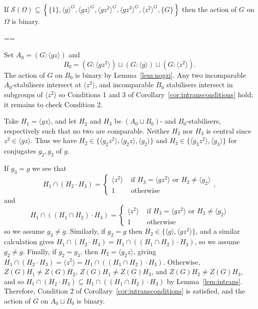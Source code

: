 \documentclass[11pt, a4paper]{amsart}
\makeatletter
\renewcommand{\proofname}{Proof}
\renewenvironment{proof}[1][\proofname]{\par
  \pushQED{\qed}  \normalfont \partopsep=\z@skip \topsep=\z@skip
  \trivlist
  \item[\hskip\labelsep
        \scshape
    #1\@addpunct{.}]\ignorespaces
}{  \popQED\endtrivlist\@endpefalse
}
\makeatother
\begin{document}
        
      
 
\begin{lemma}\label{lem:ggz}
    If $\mathcal{S}(\Omega)\subseteq\left\{\{1\},\langle g\rangle^G,\langle gz\rangle^G,\langle gz^2\rangle^G,\langle gz^3\rangle^G,\langle z^2\rangle^G,\{G\}\right\}$ then the action of $G$ on $\Omega$ is binary.
\end{lemma}
\begin{proof}
    Set $A_0=(G:\langle gz\rangle)$ and $$B_0=(G:\langle gz^2\rangle)\sqcup(G:\langle g\rangle)\sqcup(G:\langle z^2\rangle).$$ The action of $G$ on $B_0$ is binary by Lemma~\ref{lem:nogzi}. Any two incomparable $A_0$-stabilisers intersect at $\langle z^2\rangle$, and incomparable $B_0$ stabilisers intersect in subgroups of $\langle z^2\rangle$ so Conditions 1 and 3 of Corollary~\ref{cor:intransconditions} hold; it remains to check Condition 2.

    Take $H_1=\langle gz\rangle$, and let $H_2$ and $H_3$ be $(A_0\sqcup B_0)$- and $B_0$-stabilisers, respectively such that no two are comparable. Neither $H_2$ nor $H_3$ is central since $z^2\in\langle gz\rangle$. Thus we have $H_2\in\{\langle g_2z^2\rangle,\langle g_2z\rangle,\langle g_2\rangle\}$ and $H_3\in\{\langle g_3z^2\rangle,\langle g_3\rangle\}$ for conjugates $g_2,g_3$ of $g$.
    
    If $g_3=g$ we see that $$H_1\cap (H_2\cdot H_3)=\begin{cases}\langle z^2\rangle&\text{ if $H_3=\langle gz^2\rangle$ or $H_2\ne\langle g_2\rangle$}\\1&\text{ otherwise}\end{cases},$$ and $$H_1\cap((H_1\cap H_2)\cdot H_3)=\begin{cases}\langle z^2\rangle&\text{ if $H_3=\langle gz^2\rangle$ or $H_2\ne\langle g_2\rangle$}\\1&\text{ otherwise}\end{cases}$$    so we assume $g_3\ne g$. Similarly, if $g_2=g$ then $H_2\in\{\langle g\rangle,\langle gz^2\rangle\}$, and a similar calculation gives $H_1\cap (H_2\cdot H_3)=H_1\cap ((H_1\cap H_2)\cdot H_3)$, so we assume $g_2\ne g$. Finally, if $g_2=g_3$, then $H_2=\langle g_2z\rangle$, giving $H_1\cap (H_2\cdot H_3)=\langle z^2\rangle=H_1\cap ((H_1\cap H_2)\cdot H_3)$. Otherwise, $Z(G)H_1\ne Z(G)H_2$, $Z(G)H_1\ne Z(G)H_3$, and $Z(G)H_2\ne Z(G)H_3$, and so $H_1\cap(H_2\cdot H_3)\subseteq H_1\cap ((H_1\cap H_2)\cdot H_3)$ by Lemma~\ref{lem:intrans}. Therefore, Condition 2 of Corollary~\ref{cor:intransconditions} is satisfied, and the action of $G$ on $A_0\sqcup B_0$ is binary.
    

\end{proof}
\end{document}

